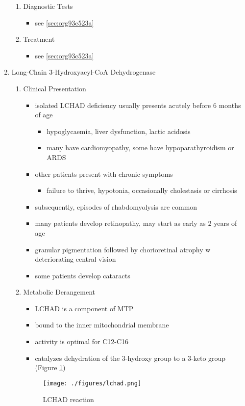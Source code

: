 \documentclass{scrartcl}
\begin{document}
\begin{enumerate}
\begin{enumerate}
\item Diagnostic Tests
\label{sec:org1e34ba5}
\begin{itemize}
\item see \ref{sec:org93c523a}
\end{itemize}

\item Treatment
\label{sec:org15e4d8e}
\begin{itemize}
\item see \ref{sec:org93c523a}
\end{itemize}
\end{enumerate}

\item Long-Chain 3-Hydroxyacyl-CoA Dehydrogenase
\label{sec:org93c523a}
\begin{enumerate}
\item Clinical Presentation
\label{sec:org6a455ff}
\begin{itemize}
\item isolated LCHAD deficiency usually presents acutely before 6 months of age
\begin{itemize}
\item hypoglycaemia, liver dysfunction, lactic acidosis
\item many have cardiomyopathy, some have hypoparathyroidism or ARDS
\end{itemize}
\item other patients present with chronic symptoms
\begin{itemize}
\item failure to thrive, hypotonia, occasionally cholestasis or cirrhosis
\end{itemize}
\item subsequently, episodes of rhabdomyolysis are common
\item many patients develop retinopathy, may start as early as 2 years of age
\item granular pigmentation followed by chorioretinal atrophy w deteriorating central vision
\item some patients develop cataracts
\end{itemize}
\item Metabolic Derangement
\label{sec:org19cee44}
\begin{itemize}
\item LCHAD is a component of MTP
\item bound to the inner mitochondrial membrane
\item activity is optimal for C12-C16
\item catalyzes dehydration of the 3-hydroxy group to a 3-keto group
(Figure \ref{fig:org1c60df2})
\end{itemize}
\begin{figure}[htbp]
\centering
\texttt{[image: ./figures/lchad.png]}
\caption{\label{fig:org1c60df2}
LCHAD reaction}
\end{figure}


\end{enumerate}
\end{enumerate}
\end{document}
